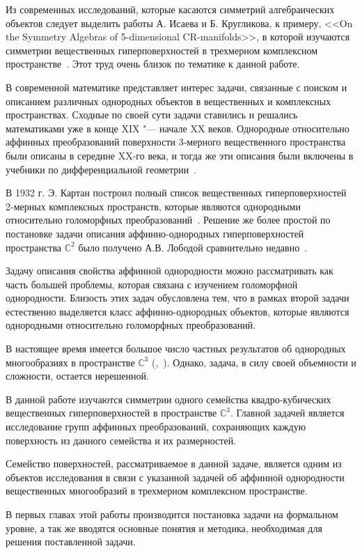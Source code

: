 \documentclass[../main.tex]{subfiles}
\begin{document}
Из современных исследований, которые касаются симметрий алгебраических объектов следует выделить работы А. Исаева и Б. Кругликова, к примеру, <<On the Symmetry Algebras of 5-dimensional CR-manifolds>>, в которой изучаются симметрии вещественных гиперповерхностей в трехмерном комплексном пространстве~\cite{IK}. Этот труд очень близок по тематике к данной работе.

В современной математике представляет интерес задачи, связанные с поиском и описанием различных однородных объектов в вещественных и комплексных пространствах. Сходные по своей сути задачи ставились и решались математиками уже в конце XIX "--- начале XX веков. Однородные относительно аффинных преобразований поверхности 3-мерного вещественного пространства были описаны в середине XX-го века, и тогда же эти описания были включены в учебники по дифференциальной геометрии~\cite{shirokov}.

В 1932 г. Э. Картан построил полный список вещественных гиперповерхностей 2-мерных комплексных пространств, которые являются однородными относительно голоморфных преобразований~\cite{cartan}. Решение же более простой по постановке задачи описания аффинно-однородных гиперповерхностей пространства $\mathbb{C}^2$ было получено А.В. Лободой сравнительно недавно~\cite{loboda_c2}.

Задачу описания свойства аффинной однородности можно рассматривать как часть большей проблемы, которая связана с изучением голоморфной однородности. Близость этих задач обусловлена тем, что в рамках второй задачи естественно выделяется класс аффинно-однородных объектов, которые являются однородными относительно голоморфных преобразований.

В настоящее время имеется большое число частных результатов об однородных многообразиях в пространстве $\mathbb{C}^3$ (\cite{ALS},~\cite{loboda_hodarev}). Однако, задача, в силу своей объемности и сложности, остается нерешенной.

В данной работе изучаются симметрии одного семейства квадро-кубических вещественных гиперповерхностей в пространстве $\mathbb{C}^3$. Главной задачей является исследование групп аффинных преобразований, сохраняющих каждую поверхность из данного семейства и их размерностей.

Семейство поверхностей, рассматриваемое в данной задаче, является одним из объектов исследования в связи с указанной задачей об аффинной однородности вещественных многообразий в трехмерном комплексном пространстве.

В первых главах этой работы производится постановка задачи на формальном уровне, а так же вводятся основные понятия и методика, необходимая для решения поставленной задачи.
\end{document}
